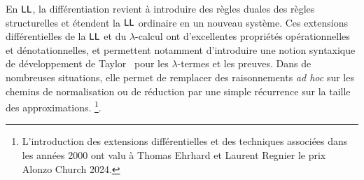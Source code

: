 \documentclass[a4]{article}
\begin{document}
En $\hbox{\textsf{LL}}$, la différentiation revient à introduire des règles duales
des règles structurelles et étendent la $\hbox{\textsf{LL}}$ ordinaire en un nouveau
système.
%
Ces extensions différentielles de la $\hbox{\textsf{LL}}$ et du $\lambda$-calcul ont
d'excellentes propriétés opérationnelles et dénotationnelles, et
permettent notamment d'introduire une notion syntaxique de
développement de Taylor~\cite{EhrhardRegnier06a} pour les $\lambda$-termes et
les preuves.
Dans de nombreuses situations, elle permet de remplacer des raisonnements
\emph{ad hoc} sur les chemins de normalisation ou de réduction par une simple
récurrence sur la taille des approximations.
%
\footnote{L'introduction des extensions différentielles et des techniques
    associées dans les années 2000 ont valu à Thomas Ehrhard et Laurent Regnier
    le prix Alonzo Church 2024.}.




\end{document}
